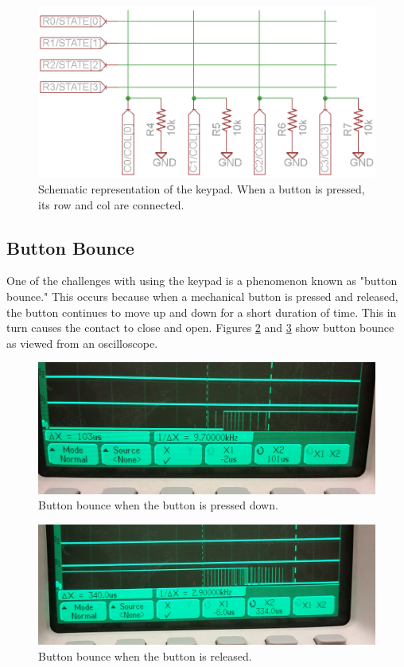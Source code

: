 \documentclass[11pt]{article}
\begin{document}
\begin{figure}[h!]
\centering
\includegraphics[scale=0.4]{keypad_sch.png}
\caption{Schematic representation of the keypad. When a button is pressed, its row and col are connected.}
\label{fig:keypad_sch}
\end{figure} 


\subsection{Button Bounce}
\label{sec:button_bounce}

One of the challenges with using the keypad is a phenomenon known as "button bounce." This occurs because when a mechanical button is pressed and released, the button continues to move up and down for a short duration of time. This in turn causes the contact to close and open. Figures \ref{fig:bounce_rise} and \ref{fig:bounce_fall} show button bounce as viewed from an oscilloscope. \\


\begin{figure}[h!]
\centering
\includegraphics[scale=0.11]{bounce_rise.jpg}
\caption{Button bounce when the button is pressed down.}
\label{fig:bounce_rise}
\end{figure} 

\begin{figure}[h!]
\centering
\includegraphics[scale=0.14]{bounce_fall.jpg}
\caption{Button bounce when the button is released.}
\label{fig:bounce_fall}
\end{figure} 
\end{document}
